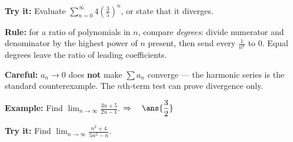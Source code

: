 \documentclass[12pt]{article}
\begin{document}
\begin{tryitbox}
\textbf{Try it:} \quad Evaluate $\sum_{n=0}^{\infty} 4\left(\frac{3}{5}\right)^{n}$, or
state that it diverges.\\[2pt]
\end{tryitbox}


\begin{formulabox}
\textbf{Rule:} for a ratio of polynomials in $n$, compare \emph{degrees}: divide numerator
and denominator by the highest power of $n$ present, then send every $\frac{1}{n^k}$ to 0.
Equal degrees leave the ratio of leading coefficients.\par
\smallskip
\textbf{Careful:} $a_n \to 0$ does \textbf{not} make $\sum a_n$ converge --- the harmonic
series is the standard counterexample. The $n$th-term test can prove divergence only.
\end{formulabox}

\begin{examplebox}
\textbf{Example:} \quad Find $\displaystyle\lim_{n\to\infty}\frac{3n+5}{2n-1}$.
$\Rightarrow\quad \ans{\dfrac{3}{2}}$
\end{examplebox}

\begin{tryitbox}
\textbf{Try it:} \quad Find $\displaystyle\lim_{n\to\infty}\frac{n^2+4}{5n^2-n}$.\\[2pt]
\end{tryitbox}
\end{document}
